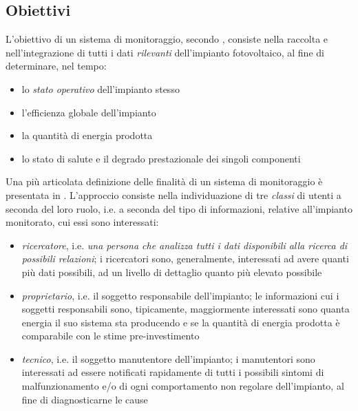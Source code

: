 %
\subsection{Obiettivi}
L'obiettivo di un sistema di monitoraggio, secondo \cite{dirks06}, consiste 
nella raccolta e nell'integrazione di tutti i dati \emph{rilevanti} dell'impianto 
fotovoltaico, al fine di determinare, nel tempo:
%
\begin{itemize}
\item lo \emph{stato operativo} dell'impianto stesso
\item l'efficienza globale dell'impianto
\item la quantit\`a di energia prodotta
\item lo stato di salute e il degrado prestazionale dei singoli componenti
\end{itemize}
%

%
Una pi\`u articolata definizione delle finalit\`a di un sistema di monitoraggio
\`e presentata in \cite{kolodenny08}. L'approccio consiste nella 
individuazione di tre \emph{classi} di utenti a seconda del loro ruolo, i.e.
a seconda del tipo di informazioni, relative all'impianto monitorato,
cui essi sono interessati:
%
\begin{itemize}
\item \emph{ricercatore}, i.e. \emph{una persona che analizza tutti i dati disponibili 
alla ricerca di possibili relazioni}; i ricercatori sono, generalmente, interessati 
ad avere quanti pi\`u dati possibili, ad un livello di dettaglio quanto pi\`u elevato
possibile
%
\item \emph{proprietario}, i.e. il soggetto responsabile dell'impianto; le informazioni
cui i soggetti responsabili sono, tipicamente, maggiormente interessati sono 
quanta energia il suo sistema sta producendo e  se la quantit\`a di energia 
prodotta \`e comparabile con le stime pre-investimento
%
\item \emph{tecnico}, i.e. il soggetto manutentore dell'impianto; i manutentori sono
interessati ad essere notificati rapidamente di tutti i possibili sintomi di malfunzionamento 
e/o di ogni comportamento non regolare dell'impianto, al fine di diagnosticarne le cause
\end{itemize}
%

%
